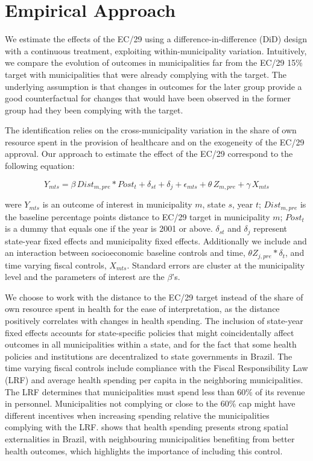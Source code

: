 \section{Empirical Approach}\label{sec:emp}

We estimate the effects of the EC/29 using a difference-in-difference (DiD) design with a continuous treatment, exploiting within-municipality variation. Intuitively, we compare the evolution of outcomes in municipalities far from the EC/29 15\% target with municipalities that were already complying with the target. The underlying assumption is that changes in outcomes for the later group provide a good counterfactual for changes that would have been observed in the former group had they been complying with the target. 

The identification relies on the cross-municipality variation in the share of own resource spent in the provision of healthcare and on the exogeneity of the EC/29 approval. Our approach to estimate the effect of the EC/29 correspond to the following equation:

\begin{equation} \label{eq:1}
    Y_{mts} = \beta \, Dist_{m,pre} * Post_t  +  \delta_{st} + \delta_j + \epsilon_{mts} + \theta \, Z_{m,pre} + \gamma \, X_{mts}
\end{equation}

were $Y_{mts}$ is an outcome of interest in municipality $m$, state $s$, year $t$; $Dist_{m,pre}$ is the baseline percentage points distance to EC/29 target in municipality $m$; $Post_t$ is a dummy that equals one if the year is 2001 or above. $\delta_{st}$ and $\delta_j$ represent state-year fixed effects and municipality fixed effects. Additionally we include and an interaction between socioeconomic baseline controls and time, $\theta Z_{j,pre} * \delta_{t}$, and time varying fiscal controls, $X_{mts}$. Standard errors are cluster at the municipality level and the parameters of interest are the $\beta$'s.

We choose to work with the distance to the EC/29 target instead of the share of own resource spent in health for the ease of interpretation, as the distance positively correlates with changes in health spending. The inclusion of state-year fixed effects accounts for state-specific policies that might coincidentally affect outcomes in all municipalities within a state, and for the fact that some health policies and institutions are decentralized to state governments in Brazil. The time varying fiscal controls include compliance with the Fiscal Responsibility Law (LRF) \citep{lrf} and average health spending per capita in the neighboring municipalities. The LRF determines that municipalities must spend less than 60\% of its revenue in personnel. Municipalities not complying or close to the 60\% cap might have different incentives when increasing spending relative the municipalities complying with the LRF. \cite{castro2021effects} shows that health spending presents strong spatial externalities in Brazil, with neighbouring municipalities benefiting from better health outcomes, which highlights the importance of including this control.

